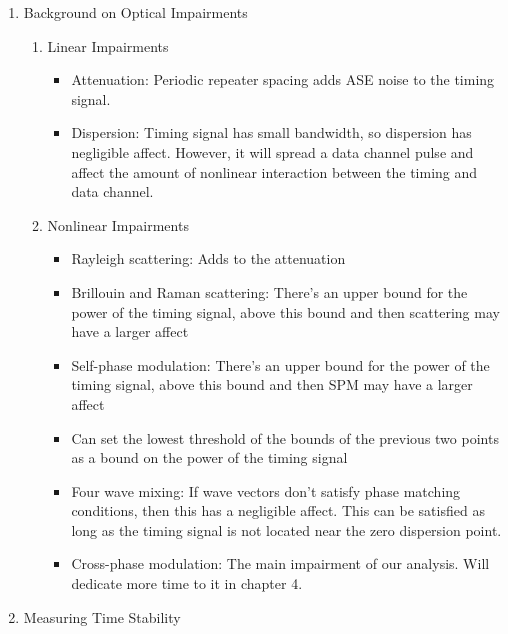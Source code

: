 \documentclass[20pt]{article}
\begin{document}
\begin{enumerate}[I]
\begin{enumerate}[i]
\end{enumerate}

\item Background on Optical Impairments

\begin{enumerate}[i]

	\item Linear Impairments
	\begin{itemize}
		\item Attenuation: Periodic repeater spacing adds ASE noise to the timing signal.
		
		\item Dispersion: Timing signal has small bandwidth, so dispersion has negligible affect.  However, it will spread a data channel pulse and affect the amount of nonlinear interaction between the timing and data channel.
	\end{itemize}

		\item Nonlinear Impairments
	\begin{itemize}
		\item Rayleigh scattering: Adds to the attenuation
		
		\item Brillouin and Raman scattering: There's an upper bound for the power of the timing signal, above this bound and then scattering may have a larger affect
		
		\item Self-phase modulation: There's an upper bound for the power of the timing signal, above this bound and then SPM may have a larger affect
		
		\item Can set the lowest threshold of the bounds of the previous two points as a bound on the power of the timing signal
		
		\item Four wave mixing: If wave vectors don't satisfy phase matching conditions, then this has a negligible affect.  This can be satisfied as long as the timing signal is not located near the zero dispersion point.
		
		\item Cross-phase modulation: The main impairment of our analysis.  Will dedicate more time to it in chapter 4.
	\end{itemize}

\end{enumerate}

\item Measuring Time Stability
\begin{enumerate}[i]


\end{enumerate}
\end{enumerate}
\end{document}
